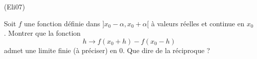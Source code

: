 \begin{tiny}(Eli07)\end{tiny} Soit $f$ une fonction définie dans $]x_0-\alpha, x_0+\alpha[$ à valeurs réelles et continue en $x_0$. Montrer que la fonction
\begin{displaymath}
 h \rightarrow f(x_0  + h) - f(x_0 - h)
\end{displaymath}
admet une limite finie (à préciser) en $0$. Que dire de la réciproque ?